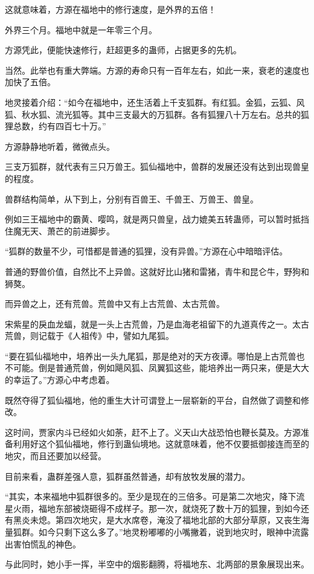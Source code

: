 \begin{this_body}
这就意味着，方源在福地中的修行速度，是外界的五倍！

外界三个月。福地中就是一年零三个月。

方源凭此，便能快速修行，赶超更多的蛊师，占据更多的先机。

当然。此举也有重大弊端。方源的寿命只有一百年左右，如此一来，衰老的速度也加快了五倍。

地灵接着介绍：“如今在福地中，还生活着上千支狐群。有红狐。金狐，云狐、风狐、秋水狐、流光狐等。其中三支最大的万狐群。各有狐狸八十万左右。总共的狐狸总数，约有四百七十万。”

方源静静地听着，微微点头。

三支万狐群，就代表有三只万兽王。狐仙福地中，兽群的发展还没有达到出现兽皇的程度。

兽群结构简单，从下到上，分别有百兽王、千兽王、万兽王、兽皇。

例如三王福地中的霸黄、嘤鸣，就是两只兽皇，战力媲美五转蛊师，可以暂时抵挡住魔无天、萧芒的前进脚步。

“狐群的数量不少，可惜都是普通的狐狸，没有异兽。”方源在心中暗暗评估。

普通的野兽价值，自然比不上异兽。这就好比山猪和雷猪，青牛和昆仑牛，野狗和狮獒。

而异兽之上，还有荒兽。荒兽中又有上古荒兽、太古荒兽。

宋紫星的戾血龙蝠，就是一头上古荒兽，乃是血海老祖留下的九道真传之一。太古荒兽，则记载于《人祖传》中，譬如九尾狐。

“要在狐仙福地中，培养出一头九尾狐，那是绝对的天方夜谭。哪怕是上古荒兽也不可能。倒是普通荒兽，例如飓风狐、凤翼狐这些，能培养出一两只来，便是大大的幸运了。”方源心中考虑着。

既然夺得了狐仙福地，他的重生大计可谓登上一层崭新的平台，自然做了调整和修改。

这时间，贾家内斗已经如火如荼，赶不上了。义天山大战恐怕也鞭长莫及。方源准备利用好这个狐仙福地，修行到蛊仙境地。这就意味着，他不仅要抵御接连而至的地灾，而且还要加以经营。

目前来看，蛊群差强人意，狐群虽然普通，却有放牧发展的潜力。

“其实，本来福地中狐群很多的。至少是现在的三倍多。可是第二次地灾，降下流星火雨，福地东部被烧砸得不成样子。那一次，就烧死了数十万的狐狸，到如今还有黑炎未熄。第四次地灾，是大水席卷，淹没了福地北部的大部分草原，又丧生海量狐群。如今只剩下这么多了。”地灵粉嘟嘟的小嘴撇着，说到地灾时，眼神中流露出害怕慌乱的神色。

与此同时，她小手一挥，半空中的烟影翻腾，将福地东、北两部的景象展现出来。


\end{this_body}
